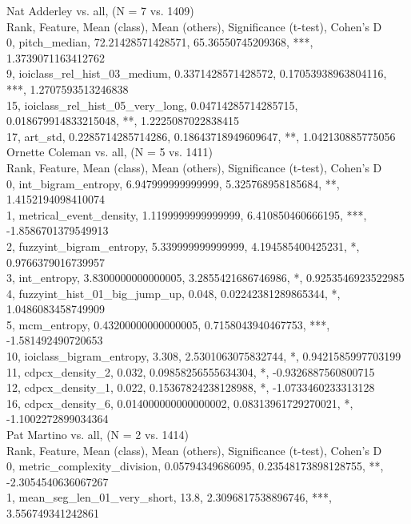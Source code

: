 Nat Adderley vs. all, (N = 7 vs. 1409)\\
Rank, Feature, Mean (class), Mean (others), Significance (t-test), Cohen's D\\
0, pitch_median, 72.21428571428571, 65.36550745209368, ***, 1.3739071163412762\\
9, ioiclass_rel_hist_03_medium, 0.3371428571428572, 0.17053938963804116, ***, 1.2707593513246838\\
15, ioiclass_rel_hist_05_very_long, 0.04714285714285715, 0.018679914833215048, **, 1.2225087022838415\\
17, art_std, 0.2285714285714286, 0.18643718949609647, **, 1.042130885775056\\
Ornette Coleman vs. all, (N = 5 vs. 1411)\\
Rank, Feature, Mean (class), Mean (others), Significance (t-test), Cohen's D\\
0, int_bigram_entropy, 6.947999999999999, 5.325768958185684, **, 1.4152194098410074\\
1, metrical_event_density, 1.1199999999999999, 6.410850460666195, ***, -1.8586701379549913\\
2, fuzzyint_bigram_entropy, 5.339999999999999, 4.194585400425231, *, 0.9766379016739957\\
3, int_entropy, 3.8300000000000005, 3.2855421686746986, *, 0.9253546923522985\\
4, fuzzyint_hist_01_big_jump_up, 0.048, 0.02242381289865344, *, 1.0486083458749909\\
5, mcm_entropy, 0.43200000000000005, 0.7158043940467753, ***, -1.581492490720653\\
10, ioiclass_bigram_entropy, 3.308, 2.5301063075832744, *, 0.9421585997703199\\
11, cdpcx_density_2, 0.032, 0.09858256555634304, *, -0.9326887560800715\\
12, cdpcx_density_1, 0.022, 0.15367824238128988, *, -1.0733460233313128\\
16, cdpcx_density_6, 0.014000000000000002, 0.08313961729270021, *, -1.1002272899034364\\
Pat Martino vs. all, (N = 2 vs. 1414)\\
Rank, Feature, Mean (class), Mean (others), Significance (t-test), Cohen's D\\
0, metric_complexity_division, 0.05794349686095, 0.23548173898128755, **, -2.3054540636067267\\
1, mean_seg_len_01_very_short, 13.8, 2.3096817538896746, ***, 3.556749341242861\\
